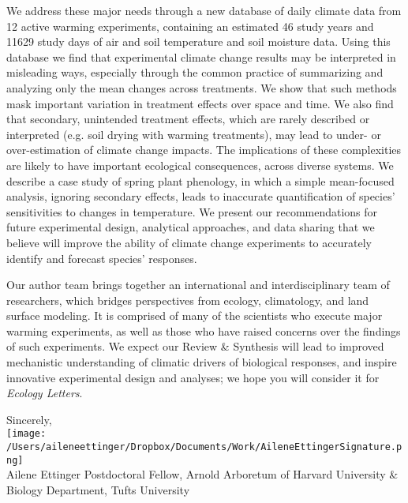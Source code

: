 \documentclass[11pt,a4paper]{letter}
\begin{document}
\begin{letter}{}
We address these major needs through a new database of daily climate data from 12 active warming experiments, containing an estimated 46 study years and 11629 study days of air and soil temperature and soil moisture data.  Using this database we find that experimental climate change results may be interpreted in misleading ways, especially through the common practice of summarizing and analyzing only the mean changes across treatments.  We show that such methods mask important variation in treatment effects over space and time. We also find that secondary, unintended treatment effects, which are rarely described or interpreted (e.g. soil drying with warming treatments), may lead to under- or over-estimation of climate change impacts. The implications of these complexities are likely to have important ecological consequences, across diverse systems. We describe a case study of spring plant phenology, in which a simple mean-focused analysis, ignoring secondary effects, leads to inaccurate quantification of species' sensitivities to changes in temperature. We present our recommendations for future experimental design, analytical approaches, and data sharing that we believe will improve the ability of climate change experiments to accurately identify and forecast species' responses.

Our author team brings together an international and interdisciplinary team of researchers, which bridges perspectives from ecology, climatology, and land surface modeling. It is comprised of many of the scientists who execute major warming experiments, as well as those who have raised concerns over the findings of such experiments.  We expect our Review \& Synthesis will lead to improved mechanistic understanding of climatic drivers of biological responses, and inspire innovative experimental design and analyses; we hope you will consider it for \emph{Ecology Letters}.

Sincerely,\\

\texttt{[image: /Users/aileneettinger/Dropbox/Documents/Work/AileneEttingerSignature.png]} \\
Ailene Ettinger
Postdoctoral Fellow, Arnold Arboretum of Harvard University \& Biology Department, Tufts University


\end{letter}
\end{document}
